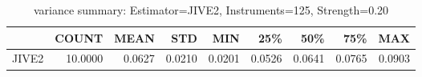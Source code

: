 \begin{table}[ht]
\centering
\caption{variance summary: Estimator=JIVE2, Instruments=125, Strength=0.20}
\begin{tabular}{lrrrrrrrr}
\toprule
 & COUNT & MEAN & STD & MIN & 25\% & 50\% & 75\% & MAX \\
\midrule
JIVE2 & 10.0000 & 0.0627 & 0.0210 & 0.0201 & 0.0526 & 0.0641 & 0.0765 & 0.0903 \\
\bottomrule
\end{tabular}
\end{table}
